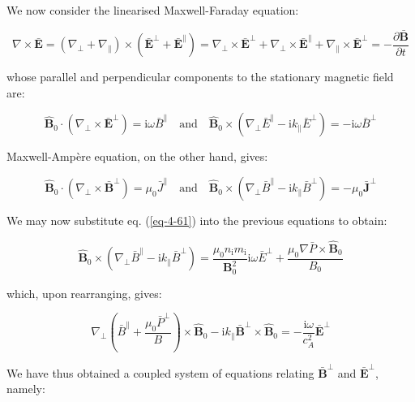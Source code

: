 We now consider the linearised Maxwell-Faraday equation:

\begin{equation}
    \nabla\times\bar{\mathbf{E}}=(\nabla_\perp+\nabla_\parallel)\times(\bar{\mathbf{E}}^\perp+\bar{\mathbf{E}}^\parallel)=\nabla_\perp\times\bar{\mathbf{E}}^\perp+\nabla_\perp\times\bar{\mathbf{E}}^\parallel+\nabla_\parallel\times\bar{\mathbf{E}}^\perp=-\frac{\partial\bar{\mathbf{B}}}{\partial t}
\end{equation}

whose parallel and perpendicular components to the stationary magnetic field are:

\begin{equation}
    \mathbf{\hat{B}}_0\cdot(\nabla_\perp\times\bar{\mathbf{E}}^\perp)=\mathrm{i}\omega\bar{B}^\parallel\quad\text{and}\quad\mathbf{\hat{B}}_0\times(\nabla_\perp\bar{E}^\parallel-\mathrm{i}k_\parallel\bar{E}^\perp)=-\mathrm{i}\omega\bar{B}^\perp
\end{equation}

Maxwell-Ampère equation, on the other hand, gives:

\begin{equation}
    \mathbf{\hat{B}}_0\cdot(\nabla_\perp\times\bar{\mathbf{B}}^\perp)=\mu_0\bar{J}^\parallel\quad\text{and}\quad\mathbf{\hat{B}}_0\times(\nabla_\perp\bar{B}^\parallel-\mathrm{i}k_\parallel\bar{B}^\perp)=-\mu_0\bar{\mathbf{J}}^\perp
\end{equation}

We may now substitute eq. (\ref{eq-4-61}) into the previous equations to obtain:

\begin{equation}
    \mathbf{\hat{B}}_0\times(\nabla_\perp\bar{B}^\parallel-\mathrm{i}k_\parallel\bar{B}^\perp)=\frac{\mu_0 n_\mathrm{i}m_\mathrm{i}}{\mathbf{B}_0^2}\mathrm{i}\omega\bar{E}^\perp+\frac{\mu_0\nabla\bar{P}\times\mathbf{\hat{B}}_0}{B_0}
\end{equation}

which, upon rearranging, gives:

\begin{equation}
    \nabla_\perp\left(\bar{B}^\parallel+\frac{\mu_0\bar{P}^\perp}{B}\right)\times\mathbf{\hat{B}}_0-\mathrm{i}k_\parallel\bar{\mathbf{B}}^\perp\times\mathbf{\hat{B}}_0=-\frac{\mathrm{i}\omega}{c_A^2}\bar{\mathbf{E}}^\perp
\end{equation}

We have thus obtained a coupled system of equations relating $\bar{\mathbf{B}}^\perp$ and $\bar{\mathbf{E}}^\perp$, namely:


